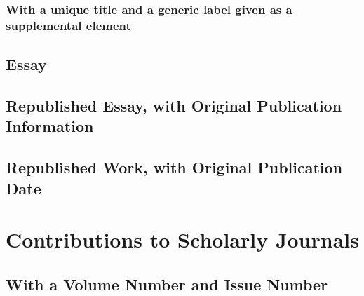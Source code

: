 \documentclass{article}
\begin{document}
\subsubsection{With a unique title and a generic label given as a supplemental element} %
\label{ssub:with_a_unique_title_and_a_generic_label_given_as_a_supplemental_element}
\begin{refsection}
	\nocite{Wallach:2000we}
	\printbibliography[heading=none]
\end{refsection}
\subsection{Essay} %
\label{sub:essay}
\begin{refsection}
	\nocite{Dewar:2007wn}
	\printbibliography[heading=none]
\end{refsection}
\subsection{Republished Essay, with Original Publication Information} %
\label{sub:republished_essay_with_original_publication_information}
\begin{refsection}
	\nocite{Johnson:2014ty}
	\printbibliography[heading=none]
\end{refsection}
\subsection{Republished Work, with Original Publication Date} %
\label{sub:republished_work_with_original_publication_date}
\begin{refsection}
	\nocite{Franklin:1992vl}
	\printbibliography[heading=none]
\end{refsection}

\section{Contributions to Scholarly Journals} %
\label{sec:contributions_to_scholarly_journals}
\subsection{With a Volume Number and Issue Number} %
\label{sub:with_a_volume_number_and_issue_number}
\begin{refsection}
	\nocite{Boggs:2016tp}
	\printbibliography[heading=none]
\end{refsection}
\end{document}
